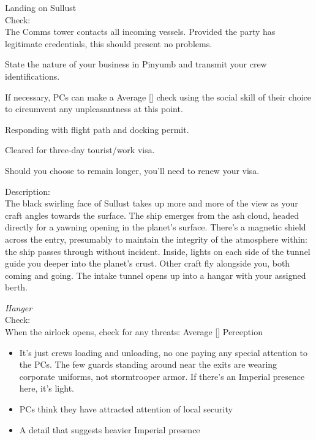 \documentclass{book}
\newcommand{\df}{\difficulty}
\begin{document}
\begin{multicols}{2}
Landing on Sullust\\
Check:\\
The Comms tower contacts all incoming vessels.  Provided the party has legitimate credentials, this should present no problems.

\begin{quoting}
State the nature of your business in Pinyumb and transmit your crew identifications.
\end{quoting}

If necessary, PCs can make a Average [\df\df] check using the social skill of their choice to circumvent any unpleasantness at this point.

\begin{quoting}
Responding with flight path and docking permit.

Cleared for three-day tourist/work visa. 

Should you choose to remain longer, you’ll need to renew your visa.
\end{quoting}

Description:\\
The black swirling face of Sullust takes up more and more of the view as your craft angles towards the surface. The ship emerges from the ash cloud, headed directly for a yawning opening in the planet’s surface. There’s a magnetic shield across the entry, presumably to maintain the integrity of the atmosphere within: the ship passes through without incident. Inside, lights on each side of the tunnel guide you deeper into the planet’s crust. Other craft fly alongside you, both coming and going. The intake tunnel opens up into a hangar with your assigned berth.

\emph{Hanger}\\
Check:\\
When the airlock opens, check for any threats: Average [\df\df] Perception
\begin{itemize}
    \item \success It’s just crews loading and unloading, no one paying any special attention to the PCs. The few guards standing around near the exits are wearing corporate uniforms, not stormtrooper armor. If there’s an Imperial presence here, it’s light.
    \item \failure PCs think they have attracted attention of local security
    \item \threat A detail that suggests heavier Imperial presence
\end{itemize}



\end{multicols}
\end{document}
